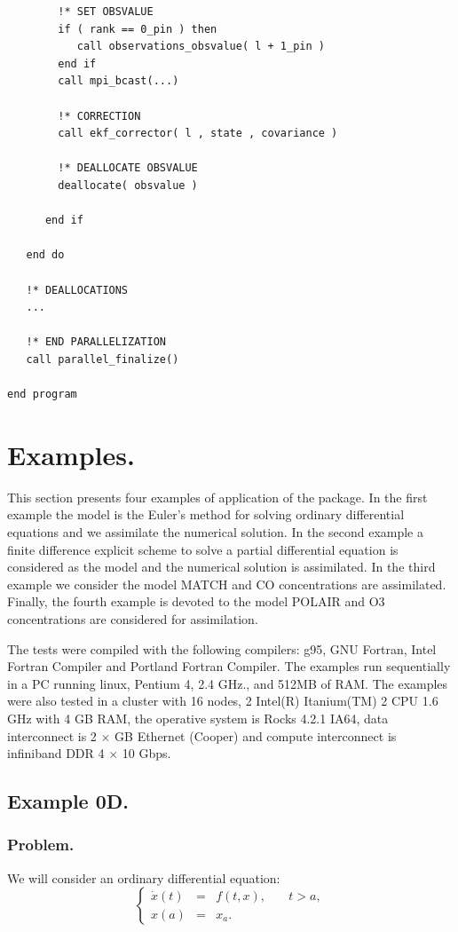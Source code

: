 \documentclass[12pt]{article}
\begin{document}
\begin{verbatim}
        !* SET OBSVALUE
        if ( rank == 0_pin ) then
           call observations_obsvalue( l + 1_pin )
        end if
        call mpi_bcast(...)
        
        !* CORRECTION
        call ekf_corrector( l , state , covariance )

        !* DEALLOCATE OBSVALUE
        deallocate( obsvalue )

      end if

   end do

   !* DEALLOCATIONS
   ...

   !* END PARALLELIZATION
   call parallel_finalize()

end program
\end{verbatim}

\section{Examples.}
This section presents four examples of application of the package. In the first example the model is the Euler's method for solving ordinary differential equations and we assimilate the numerical solution. In the second example a finite difference explicit scheme to solve a partial differential equation is considered as the model and the numerical solution is assimilated. In the third example we consider the model MATCH \cite{MATCHmodel} and CO concentrations are assimilated. Finally, the fourth example is devoted to the model POLAIR \cite{POLAIR3Dmodel} and O3 concentrations are considered for assimilation.

The tests were compiled with the following compilers: g95, GNU Fortran, Intel Fortran Compiler and Portland Fortran Compiler. The examples run sequentially in a PC running linux, Pentium 4, 2{.}4 GHz., and 512MB of RAM. The examples were also tested in a cluster with 16 nodes, 2 Intel(R) Itanium(TM) 2 CPU 1.6 GHz with 4 GB RAM, the operative system is Rocks 4.2.1 IA64, data interconnect is 2 $\times$ GB Ethernet (Cooper) and compute interconnect is infiniband DDR 4 $\times$ 10 Gbps. 

\subsection{Example 0D.}

\subsubsection{Problem.} 
We will consider an ordinary differential equation:
\begin{equation} \label{equation: problem 0d example}
\left\{ \begin{array}{lcll} 
\dot{x} \left( t \right) & = & f \left( t , x \right), & \quad t > a, 
\\ 
x \left( a \right) & = & x_a. & 
\end{array} \right.
\end{equation}
\end{document}
